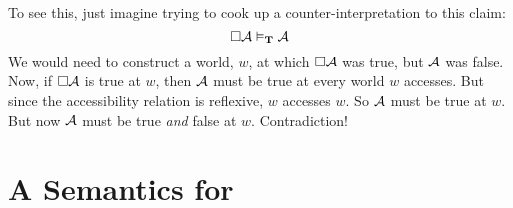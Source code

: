 To see this, just imagine trying to cook up a counter-interpretation to this claim:
\[
	\Box \mathcal{A}\vDash_{\mathbf{T}} \mathcal{A}
\]
We would need to construct a world, $w$, at which $\Box \mathcal{A}$ was true, but $\mathcal{A}$ was false. Now, if $\Box \mathcal{A}$ is true at $w$, then $\mathcal{A}$ must be true at every world $w$ accesses. But since the accessibility relation is reflexive, $w$ accesses $w$. So $\mathcal{A}$ must be true at $w$. But now $\mathcal{A}$ must be true \emph{and} false at $w$. Contradiction!

\section{A Semantics for \mlSfour}
\label{SemanticsS4}

